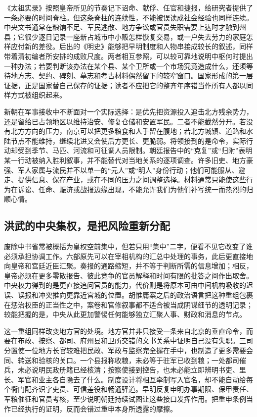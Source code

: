 《太祖实录》按照皇帝所见的节奏记下诏命、献俘、任官和捷报，给研究者提供了一条必要的时间脊柱。但这条脊柱的连续性，不能被误读成社会经验也同样连续。中央文书通常在粮饷不足、军民逃散、地方争讼或官员失职需要上达时才触到州县；它很少逐日记录一座新占城市中小贩怎样恢复交易，或一户失去劳力的家庭怎样应付新的差役。后出的《明史》能够把早明制度和人物串接成较长的叙述，同样带着清初编者所安排的成败尺度。两者相互参照，可以较可靠地说明中枢何时提出一种办法；若要判断该办法在某个县、某个卫所或一个市场究竟造成什么，还须等待地方志、契约、碑刻、墓志和考古材料偶然留下的较窄窗口。国家形成的第一层证据，正是国家替自己保存的证据；读者不应把它的整齐年序错当作所有人都以同样方式被组织起来。

新朝在军事接收中不断面对一个实际选择：是优先把资源投入追击北方残余势力，还是留给已占领地区以维持治安、修复仓储和安置军民。二者不能截然分开。若没有北方方向的压力，南京可以把更多粮食和人手留在腹地；若北方城镇、道路和水陆节点不能维持，继续北进又会使后方更长、更脆弱。将领接到的是命令，实际行动却受到季节、马匹、河流和可征调人员限制。朝廷报告中的“克复”或“归附”表明某一行动被纳入胜利叙事，并不能替代对当地关系的逐项调查。许多旧吏、地方豪强、军人家属与流民并不以单一的“元人”或“明人”身份行动；他们可能服从、避走、提供信息、保存产业，或在不同的压力之间调整选择。材料通常只能使这些行为在诉讼、任命、赈济或战报边缘出现，不能允许我们为他们补写统一而热烈的归顺心情。

\subsection{洪武的中央集权，是把风险重新分配}

废除中书省常被概括为皇权空前集中，但若只用“集中”二字，便看不见它改变了谁必须承担协调工作。六部原先可以在宰相机构的汇总中处理的事务，此后更直接地向皇帝和宫廷近臣汇聚。奏报的通路缩短，并不等于判断所需的信息增加；相反，皇帝必须在更多零散报告、彼此竞争的官员解释和时间有限的批答之间作出取舍。中央权力得到的是更直接追问官员的能力，代价则是将原本可由中间机构吸收的迟误、误报和冲突推向更靠近宫城的位置。胡惟庸案之后的政治语言把这种重组包裹在惩治权臣的正当性之中，案卷和官修叙事都不适合被当成阴谋细节的透明记录；较能把握的是，中央从此更加警惕任何能够独立汇聚人事、财政和消息的节点。

这一重组同样改变地方官的处境。地方官并非只接受一条来自北京的垂直命令，而要在布政、按察、都司、府州县和卫所交错的文书关系中证明自己没有失职。三司分置使一位地方长官较难把民政、军政与监察完全握在手中，也制造了更多需要会同、转送和验核的关口。一个县报称收粮，未必等于驻军已收到粮；一处都司催兵，未必说明民政册籍已经核清；按察使接到控告，也未必能立即辨明书吏、里长、军官和业主各自隐去了什么。制度设计将相互牵制写入官名，却不能自动给每个衙门配齐识字吏员、可信差役和畅通驿道。早明反复申明办事期限、保甲责任、军粮催征和官员考核，至少说明朝廷持续试图让这些接口发挥作用。把重申条例当作已经执行的证明，反而会错过重申本身所透露的摩擦。

